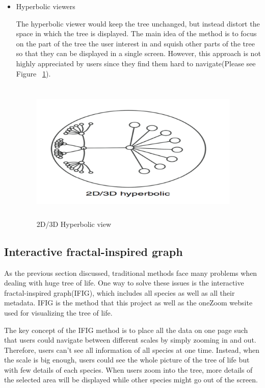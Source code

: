 \documentclass[a4paper,11pt,twoside]{report}
\begin{document}
\begin{itemize}
  \item Hyperbolic viewers
  
  The hyperbolic viewer would keep the tree unchanged, but instead distort the space in which the tree is displayed.\cite{euclidean} The main idea of the method is to focus on the part of the tree the user interest in and squish other parts of the tree so that they can be displayed in a single screen. However, this approach is not highly appreciated by users since they find them hard to navigate(Please see Figure ~\ref{fig:Hyperbolic}).
  
  \begin{figure}[H]
  \centering
  \includegraphics [width=10cm,height=6.8cm]{Hyperbolic}
  \caption{2D/3D Hyperbolic view}
  \label{fig:Hyperbolic}
\end{figure}

\end{itemize}


\subsection{Interactive fractal-inspired graph}

As the previous section discussed, traditional methods face many problems when dealing with huge tree of life. One way to solve these issues is the interactive fractal-inspired graph(IFIG), which includes all species as well as all their metadata. IFIG is the method that this project as well as the oneZoom website used for visualizing the tree of life. 

The key concept of the IFIG method is to place all the data on one page such that users could navigate between different scales by simply zooming in and out.\cite{oneZoomWebsite} Therefore, users can't see all information of all species at one time. Instead, when the scale is big enough, users could see the whole picture of the tree of life but with few details of each species. When users zoom into the tree, more details of the selected area will be displayed while other species might go out of the screen.
\end{document}
